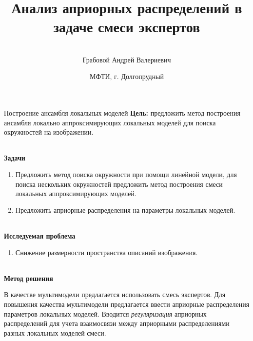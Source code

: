 \documentclass[9pt,pdf,hyperref={unicode}]{beamer}
\title[\hbox to 56mm{Смеси экспертов \hfill\insertframenumber\,/\,\inserttotalframenumber}]
{Анализ априорных распределений в задаче смеси экспертов}
\author[А.\,В.~Грабовой]{\large \\Грабовой Андрей Валериевич}
\institute{\large
Московский физико-технический институт}
\date{\footnotesize{МФТИ, г. Долгопрудный}}
\begin{document}
\begin{frame}
\titlepage
\end{frame}

\begin{frame}{Построение ансамбля локальных моделей}
\justifying
\textbf{Цель:} предложить метод построения ансамбля локально аппроксимирующих локальных моделей для поиска окружностей на изображении.

~\\
\textbf{Задачи}

\begin{enumerate}
\justifying
	\item Предложить метод поиска окружности при помощи линейной модели, для поиска нескольких окружностей предложить метод построения смеси локальных аппроксимирующих моделей.
	\item Предложить априорные распределения на параметры локальных моделей.
\end{enumerate}

~\\
\textbf{Исследуемая проблема}
\begin{enumerate}
\justifying
	\item Снижение размерности пространства описаний изображения.
\end{enumerate}

~\\
\textbf{Метод решения}

	В качестве мультимодели предлагается использовать смесь экспертов. Для повышения качества мультимодели предлагается ввести априорные распределения параметров локальных моделей. Вводится \textit{регуляризация} априорных распределений для учета взаимосвязи между априорными распределениями разных локальных моделей смеси.
	
\end{frame}
\end{document}
